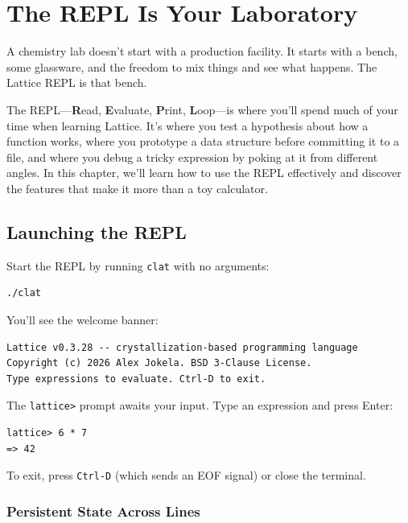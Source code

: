 \chapter{The REPL Is Your Laboratory}\label{ch:repl}


A chemistry lab doesn't start with a production facility.
It starts with a bench, some glassware, and the freedom to mix things and see what happens.
The Lattice REPL is that bench.

The REPL---\textbf{R}ead, \textbf{E}valuate, \textbf{P}rint, \textbf{L}oop---is where you'll spend much of your time when learning Lattice.
It's where you test a hypothesis about how a function works, where you prototype a data structure before committing it to a file, and where you debug a tricky expression by poking at it from different angles.
In this chapter, we'll learn how to use the REPL effectively and discover the features that make it more than a toy calculator.

\section{Launching the REPL}\label{sec:launching-repl}

Start the REPL by running \texttt{clat} with no arguments:

\begin{lstlisting}[language=bash, numbers=none]
./clat
\end{lstlisting}

You'll see the welcome banner:

\begin{lstlisting}[numbers=none]
Lattice v0.3.28 -- crystallization-based programming language
Copyright (c) 2026 Alex Jokela. BSD 3-Clause License.
Type expressions to evaluate. Ctrl-D to exit.
\end{lstlisting}

The \lstinline|lattice>| prompt awaits your input.
Type an expression and press Enter:

\begin{lstlisting}[language=Lattice, numbers=none]
lattice> 6 * 7
=> 42
\end{lstlisting}

To exit, press \texttt{Ctrl-D} (which sends an EOF signal) or close the terminal.

\subsection{Persistent State Across Lines}\label{subsec:persistent-state}

